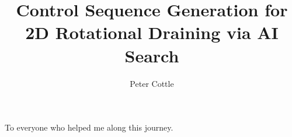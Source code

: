 \documentclass[masters]{ucbthesis}
\begin{document}

\title{Control Sequence Generation for 2D Rotational Draining via AI Search}
\author{Peter Cottle}


\maketitle
\approvalpage
\copyrightpage



\begin{frontmatter}



\tableofcontents
\clearpage
\listoffigures
\clearpage
\listoftables

\begin{acknowledgements}
\begin{center}
To everyone who helped me along this journey.
\end{center}
\end{acknowledgements}

\end{frontmatter}

\pagestyle{headings}










\printbibliography
\end{document}
